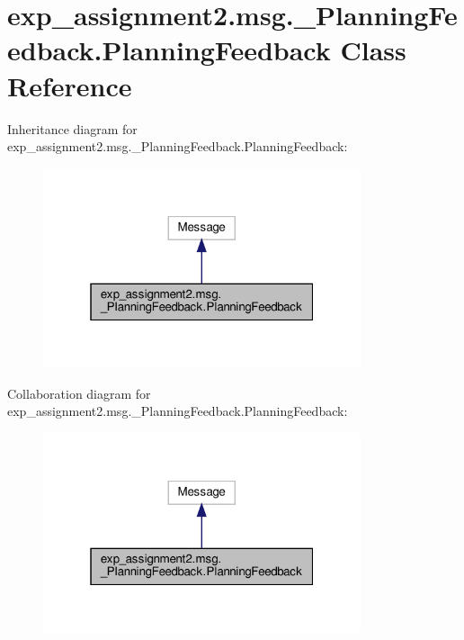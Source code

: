 \hypertarget{classexp__assignment2_1_1msg_1_1__PlanningFeedback_1_1PlanningFeedback}{}\section{exp\+\_\+assignment2.\+msg.\+\_\+\+Planning\+Feedback.\+Planning\+Feedback Class Reference}
\label{classexp__assignment2_1_1msg_1_1__PlanningFeedback_1_1PlanningFeedback}


Inheritance diagram for exp\+\_\+assignment2.\+msg.\+\_\+\+Planning\+Feedback.\+Planning\+Feedback\+:
\nopagebreak
\begin{figure}[H]
\begin{center}
\leavevmode
\includegraphics[width=265pt]{classexp__assignment2_1_1msg_1_1__PlanningFeedback_1_1PlanningFeedback__inherit__graph}
\end{center}
\end{figure}


Collaboration diagram for exp\+\_\+assignment2.\+msg.\+\_\+\+Planning\+Feedback.\+Planning\+Feedback\+:
\nopagebreak
\begin{figure}[H]
\begin{center}
\leavevmode
\includegraphics[width=265pt]{classexp__assignment2_1_1msg_1_1__PlanningFeedback_1_1PlanningFeedback__coll__graph}
\end{center}
\end{figure}

